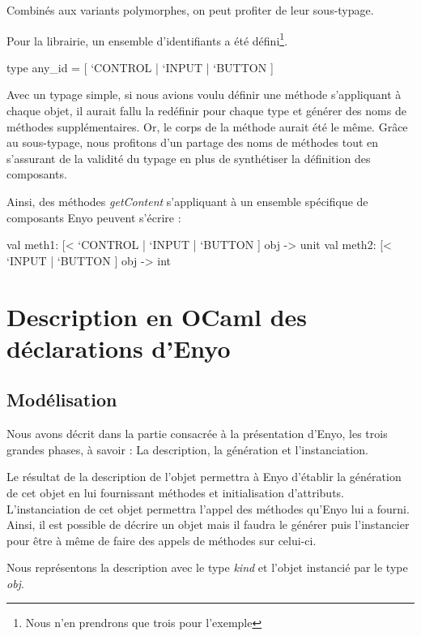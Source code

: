\documentclass[11pt,a4paper]{report}
\begin{document}
Combinés aux variants polymorphes, on peut profiter de leur sous-typage.

Pour la librairie, un ensemble d'identifiants a été défini\footnote{Nous n'en prendrons que 
trois pour l'exemple}.

\begin{OCaml}
  type any_id = [ `CONTROL | `INPUT | `BUTTON ]
\end{OCaml}

Avec un typage simple, si nous avions voulu définir une méthode s'appliquant à chaque objet, il aurait
fallu la redéfinir pour chaque type et générer des noms de méthodes supplémentaires. 
Or, le corps de la méthode aurait été le même. 
Grâce au sous-typage, nous profitons d'un partage des noms de méthodes tout en s'assurant de la validité
du typage en plus de synthétiser la définition des composants.

Ainsi, des méthodes \emph{getContent} s'appliquant à un ensemble spécifique de composants Enyo
peuvent s'écrire :
\begin{OCaml}
  val meth1: [< `CONTROL | `INPUT | `BUTTON ] obj -> unit
  val meth2: [< `INPUT | `BUTTON ] obj -> int
\end{OCaml}


\section{Description en OCaml des déclarations d'Enyo}
\subsection{Modélisation}

Nous avons décrit dans la partie consacrée à la présentation d'Enyo, les trois grandes phases, à savoir :
La description, la génération et l'instanciation.

Le résultat de la description de l'objet permettra à Enyo d'établir la génération de cet objet en lui
fournissant méthodes et initialisation d'attributs. L'instanciation de cet objet permettra l'appel
des méthodes qu'Enyo lui a fourni. Ainsi, il est possible de décrire un objet mais il faudra
le générer puis l'instancier pour être à même de faire des appels de méthodes sur celui-ci.

Nous représentons la description avec le type \emph{kind} et l'objet instancié par le type \emph{obj}.
\end{document}
